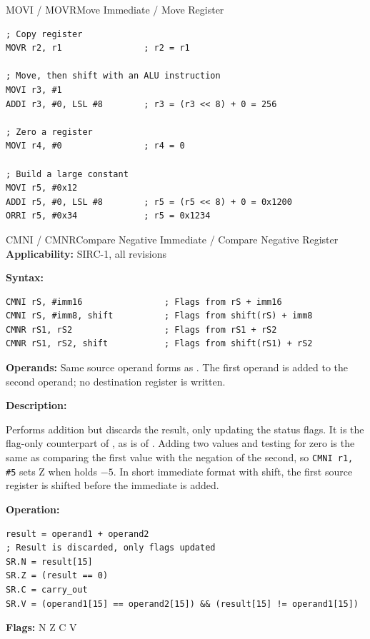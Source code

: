 \begin{instructionbox}{MOVI / MOVR}{Move Immediate / Move Register}
\begin{example}
\begin{lstlisting}
; Copy register
MOVR r2, r1                ; r2 = r1

; Move, then shift with an ALU instruction
MOVI r3, #1
ADDI r3, #0, LSL #8        ; r3 = (r3 << 8) + 0 = 256

; Zero a register
MOVI r4, #0                ; r4 = 0

; Build a large constant
MOVI r5, #0x12
ADDI r5, #0, LSL #8        ; r5 = (r5 << 8) + 0 = 0x1200
ORRI r5, #0x34             ; r5 = 0x1234
		\end{lstlisting}
		\caption{Moving Constants and Copying Registers}
	\end{example}
\end{instructionbox}

\begin{instructionbox}{CMNI / CMNR}{Compare Negative Immediate / Compare Negative Register}
	\textbf{Applicability:} SIRC-1, all revisions

	\textbf{Syntax:}
	\begin{lstlisting}
CMNI rS, #imm16                ; Flags from rS + imm16
CMNI rS, #imm8, shift          ; Flags from shift(rS) + imm8
CMNR rS1, rS2                  ; Flags from rS1 + rS2
CMNR rS1, rS2, shift           ; Flags from shift(rS1) + rS2
\end{lstlisting}

	\textbf{Operands:} Same source operand forms as . The first operand is added to the second operand;
	no destination register is written.

	\textbf{Description:}

	Performs addition but discards the result, only updating the status flags. It is the flag-only counterpart of
	, as  is of . Adding two values and testing for zero is the same as comparing
	the first value with the negation of the second, so \texttt{CMNI r1, \#5} sets Z when  holds $-5$. In short
	immediate format with shift, the first source register is shifted before the immediate is added.

	\textbf{Operation:}
	\begin{verbatim}
result = operand1 + operand2
; Result is discarded, only flags updated
SR.N = result[15]
SR.Z = (result == 0)
SR.C = carry_out
SR.V = (operand1[15] == operand2[15]) && (result[15] != operand1[15])
\end{verbatim}

	\textbf{Flags:} N Z C V


\end{instructionbox}
